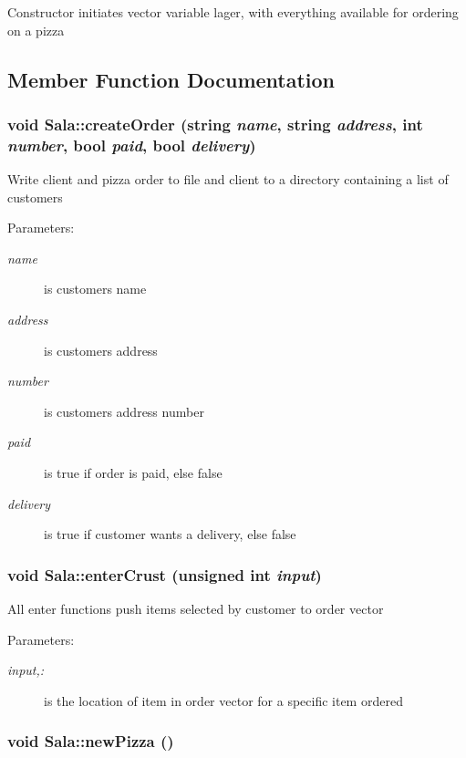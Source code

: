 Constructor initiates vector variable lager, with everything available for ordering on a pizza 

\subsection{Member Function Documentation}
\hypertarget{class_sala_9f3c48158017cdc015a985e9712f0179}{
\subsubsection[createOrder]{\setlength{\rightskip}{0pt plus 5cm}void Sala::create\-Order (string {\em name}, string {\em address}, int {\em number}, bool {\em paid}, bool {\em delivery})}}
\label{class_sala_9f3c48158017cdc015a985e9712f0179}


Write client and pizza order to file and client to a directory containing a list of customers

\begin{Desc}
\item[Parameters:]
\begin{description}
\item[{\em name}]is customers name \item[{\em address}]is customers address \item[{\em number}]is customers address number \item[{\em paid}]is true if order is paid, else false \item[{\em delivery}]is true if customer wants a delivery, else false \end{description}
\end{Desc}
\hypertarget{class_sala_ae3b8375ca0ab5b62e84f86582b8cec3}{
\subsubsection[enterCrust]{\setlength{\rightskip}{0pt plus 5cm}void Sala::enter\-Crust (unsigned int {\em input})}}
\label{class_sala_ae3b8375ca0ab5b62e84f86582b8cec3}


All enter functions push items selected by customer to order vector

\begin{Desc}
\item[Parameters:]
\begin{description}
\item[{\em input,:}]is the location of item in order vector for a specific item ordered \end{description}
\end{Desc}
\hypertarget{class_sala_eadce54d849ca6634b7fdd389bd8f192}{
\subsubsection[newPizza]{\setlength{\rightskip}{0pt plus 5cm}void Sala::new\-Pizza ()}}
\label{class_sala_eadce54d849ca6634b7fdd389bd8f192}


